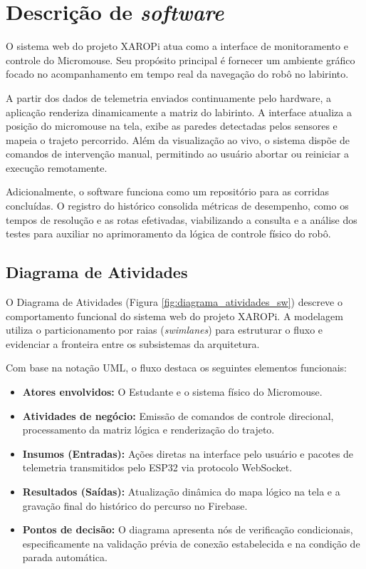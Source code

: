 \section{Descrição de \textit{software}}

O sistema web do projeto XAROPi atua como a interface de monitoramento e controle do Micromouse. Seu propósito principal é fornecer um ambiente gráfico focado no acompanhamento em tempo real da navegação do robô no labirinto.

A partir dos dados de telemetria enviados continuamente pelo hardware, a aplicação renderiza dinamicamente a matriz do labirinto. A interface atualiza a posição do micromouse na tela, exibe as paredes detectadas pelos sensores e mapeia o trajeto percorrido. Além da visualização ao vivo, o sistema dispõe de comandos de intervenção manual, permitindo ao usuário abortar ou reiniciar a execução remotamente.

Adicionalmente, o software funciona como um repositório para as corridas concluídas. O registro do histórico consolida métricas de desempenho, como os tempos de resolução e as rotas efetivadas, viabilizando a consulta e a análise dos testes para auxiliar no aprimoramento da lógica de controle físico do robô.


\subsection{Diagrama de Atividades}

O Diagrama de Atividades (Figura \ref{fig:diagrama_atividades_sw}) descreve o comportamento funcional do sistema web do projeto XAROPi. A modelagem utiliza o particionamento por raias (\textit{swimlanes}) para estruturar o fluxo e evidenciar a fronteira entre os subsistemas da arquitetura.

Com base na notação UML, o fluxo destaca os seguintes elementos funcionais:
\begin{itemize}
    \item \textbf{Atores envolvidos:} O Estudante e o sistema físico do Micromouse.
    \item \textbf{Atividades de negócio:} Emissão de comandos de controle direcional, processamento da matriz lógica e renderização do trajeto.
    \item \textbf{Insumos (Entradas):} Ações diretas na interface pelo usuário e pacotes de telemetria transmitidos pelo ESP32 via protocolo WebSocket.
    \item \textbf{Resultados (Saídas):} Atualização dinâmica do mapa lógico na tela e a gravação final do histórico do percurso no Firebase.
    \item \textbf{Pontos de decisão:} O diagrama apresenta nós de verificação condicionais, especificamente na validação prévia de conexão estabelecida e na condição de parada automática.
\end{itemize}

